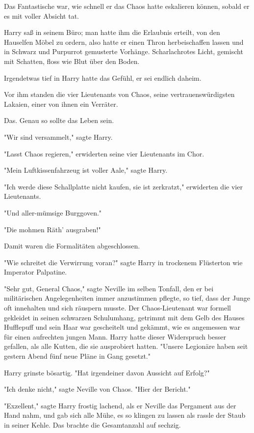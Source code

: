 {\later

Das Fantastische war, wie schnell er das Chaos hatte eskalieren können, sobald er es mit voller Absicht tat.

Harry saß in seinem Büro; man hatte ihm die Erlaubnis erteilt, von den Hauselfen Möbel zu ordern, also hatte er einen Thron herbeischaffen lassen und in Schwarz und Purpurrot gemusterte Vorhänge. Scharlachrotes Licht, gemischt mit Schatten, floss wie Blut über den Boden.

Irgendetwas tief in Harry hatte das Gefühl, er sei endlich daheim.

Vor ihm standen die vier Lieutenants von Chaos, seine vertrauenswürdigsten Lakaien, einer von ihnen ein Verräter.

Das. Genau so sollte das Leben sein.

"Wir sind versammelt," sagte Harry.

"Lasst Chaos regieren," erwiderten seine vier Lieutenants im Chor.

"Mein Luftkissenfahrzeug ist voller Aale," sagte Harry.

"Ich werde diese Schallplatte nicht kaufen, sie ist zerkratzt," erwiderten die vier Lieutenants.

"Und aller-mümsige Burggoven."

"Die mohmen Räth' ausgraben!"

Damit waren die Formalitäten abgeschlossen.

"Wie schreitet die Verwirrung voran?" sagte Harry in trockenem Flüsterton wie Imperator Palpatine.

"Sehr gut, General Chaos," sagte Neville im selben Tonfall, den er bei militärischen Angelegenheiten immer anzustimmen pflegte, so tief, dass der Junge oft innehalten und sich räuspern musste. Der Chaos-Lieutenant war formell gekleidet in seinen schwarzen Schulumhang, getrimmt mit dem Gelb des Hauses Hufflepuff und sein Haar war gescheitelt und gekämmt, wie es angemessen war für einen aufrechten jungen Mann. Harry hatte dieser Widerspruch besser gefallen, als alle Kutten, die sie ausprobiert hatten. "Unsere Legionäre haben seit gestern Abend fünf neue Pläne in Gang gesetzt."

Harry grinste bösartig. "Hat irgendeiner davon Aussicht auf Erfolg?"

"Ich denke nicht," sagte Neville von Chaos. "Hier der Bericht."

"Exzellent," sagte Harry frostig lachend, als er Neville das Pergament aus der Hand nahm, und gab sich alle Mühe, es so klingen zu lassen als rassle der Staub in seiner Kehle. Das brachte die Gesamtanzahl auf sechzig.

}
